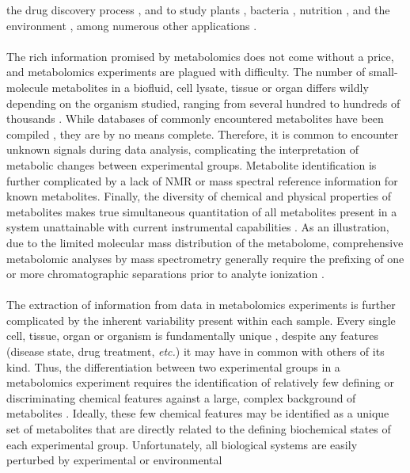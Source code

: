 \begin{doublespace}
the drug discovery process \cite{powers:mrc2009,wilcoxen:eodd2010}, and to
study plants \cite{hall:pcell2002}, bacteria
\cite{zhang:jiomic2013,tang:cgen2011}, nutrition
\cite{mcniven:jnb2011}, and the environment
\cite{bundy:metab2009}, among numerous other applications
\cite{baker:nmeth2011}.
\\\\
The rich information promised by metabolomics does not come without a price,
and metabolomics experiments are plagued with difficulty. The number of
small-molecule metabolites in a biofluid, cell lysate, tissue or organ differs
wildly depending on the organism studied, ranging from several hundred to
hundreds of thousands \cite{dunn:trac2005}. While databases of commonly
encountered metabolites have been compiled
\cite{wishart:nar2007,cui:nbiot2008,kind:anchem2009}, they are by no
means complete. Therefore, it is common to encounter unknown signals during
data analysis, complicating the interpretation of metabolic changes between
experimental groups. Metabolite identification is further complicated by a
lack of NMR or mass spectral reference information for known metabolites.
Finally, the diversity of chemical and physical properties of metabolites
makes true simultaneous quantitation of all metabolites present in a system
unattainable with current instrumental capabilities
\cite{lindon:cmr2000,dunn:trac2005,dettmer:msr2007}. As an illustration,
due to the limited molecular mass distribution of the metabolome, comprehensive
metabolomic analyses by mass spectrometry generally require the prefixing of
one or more chromatographic separations prior to analyte ionization
\cite{kell:opin2004,viswanadhan:acsccc2011}.
\\\\
The extraction of information from data in metabolomics experiments is further
complicated by the inherent variability present within each sample. Every
single cell, tissue, organ or organism is fundamentally unique
\cite{rubakhin:nmeth2011}, despite any features (disease state, drug
treatment, {\it etc.}) it may have in common with others of its kind. Thus,
the differentiation between two experimental groups in a metabolomics
experiment requires the identification of relatively few defining or
discriminating chemical features against a large, complex background of
metabolites \cite{wishart:nar2007}. Ideally, these few chemical features
may be identified as a unique set of metabolites that are directly related to
the defining biochemical states of each experimental group. Unfortunately, all
biological systems are easily perturbed by experimental or environmental

\end{doublespace}
